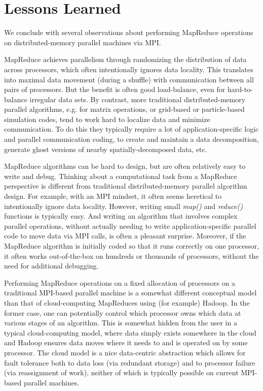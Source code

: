 \section{Lessons Learned}
\label{sec:lessons}

We conclude with several observations about performing MapReduce
operations on distributed-memory parallel machines via MPI.

MapReduce achieves parallelism through randomizing the distribution of
data across processors, which often intentionally ignores data
locality.  This translates into maximal data movement (during a
shuffle) with communication between all pairs of processors.  But the
benefit is often good load-balance, even for hard-to-balance irregular
data sets.  By contrast, more traditional distributed-memory parallel
algorithms, e.g. for matrix operations, or grid-based or
particle-based simulation codes, tend to work hard to localize data
and minimize communication.  To do this they typically require a lot
of application-specific logic and parallel communication coding, to
create and maintain a data decomposition, generate ghost versions of
nearby spatially-decomposed data, etc.

MapReduce algorithms can be hard to design, but are often relatively
easy to write and debug.  Thinking about a computational task from a
MapReduce perspective is different from traditional distributed-memory
parallel algorithm design.  For example, with an MPI mindset, it often
seems heretical to intentionally ignore data locality.  However,
writing small {\it map()} and {\it reduce()} functions is typically easy.  And
writing an algorithm that involves complex parallel operations,
without actually needing to write application-specific parallel code
to move data via MPI calls, is often a pleasant surprise.  Moreover,
if the MapReduce algorithm is initially coded so that it runs
correctly on one processor, it often works out-of-the-box on hundreds
or thousands of processors, without the need for additional debugging.

Performing MapReduce operations on a fixed allocation of processors on
a traditional MPI-based parallel machine is a somewhat different
conceptual model than that of cloud-computing MapReduces using (for
example) Hadoop.  In the former case, one can potentially control
which processor owns which data at various stages of an algorithm.
This is somewhat hidden from the user in a typical cloud-computing
model, where data simply exists somewhere in the cloud and Hadoop
ensures data moves where it needs to and is operated on by some
processor.  The cloud model is a nice data-centric abstraction which
allows for fault tolerance both to data loss (via redundant storage)
and to processor failure (via reassignment of work), neither of which
is typically possible on current MPI-based parallel machines.

